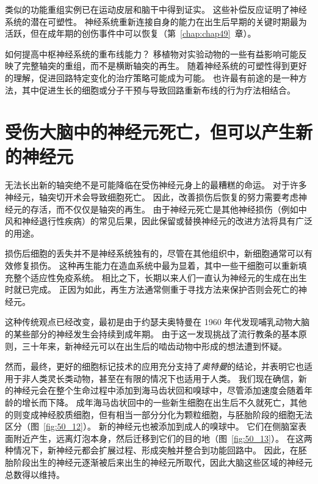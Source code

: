 类似的功能重组实例已在运动皮层和脑干中得到证实。
这些补偿反应证明了神经系统的潜在可塑性。
神经系统重新连接自身的能力在出生后早期的关键时期最为活跃，但在成年期的创伤事件中可以恢复（第~\ref{chap:chap49}~章）。


如何提高中枢神经系统的重布线能力？
移植物对实验动物的一些有益影响可能反映了完整轴突的重组，而不是横断轴突的再生。
随着神经系统的可塑性得到更好的理解，促进回路特定变化的治疗策略可能成为可能。
也许最有前途的是一种方法，其中促进生长的细胞或分子干预与导致回路重新布线的行为疗法相结合。



\section{受伤大脑中的神经元死亡，但可以产生新的神经元}

无法长出新的轴突绝不是可能降临在受伤神经元身上的最糟糕的命运。
对于许多神经元，轴突切开术会导致细胞死亡。
因此，改善损伤后恢复的努力需要考虑神经元的存活，而不仅仅是轴突的再生。
由于神经元死亡是其他神经损伤（例如中风和神经退行性疾病）的常见后果，因此保留或替换神经元的改进方法将具有广泛的用途。


损伤后细胞的丢失并不是神经系统独有的，尽管在其他组织中，新细胞通常可以有效修复损伤。
这种再生能力在造血系统中最为显着，其中一些干细胞可以重新填充整个适应性免疫系统。
相比之下，长期以来人们一直认为神经元的生成在出生时就已完成。
正因为如此，再生方法通常侧重于寻找方法来保护否则会死亡的神经元。


这种传统观点已经改变，最初是由于约瑟夫奥特曼在 1960 年代发现哺乳动物大脑的某些部分的神经发生会持续到成年期。
由于这一发现挑战了流行教条的基本原则，三十年来，新神经元可以在出生后的啮齿动物中形成的想法遭到怀疑。


然而，最终，更好的细胞标记技术的应用充分支持了\textit{奥特曼}的结论，并表明它也适用于非人类灵长类动物，甚至在有限的情况下也适用于人类。
我们现在确信，新的神经元会在整个生命过程中添加到海马齿状回和嗅球中，尽管添加速度会随着年龄的增长而下降。
成年海马齿状回中的一些新生细胞在出生后不久就死亡，其他的则变成神经胶质细胞，但有相当一部分分化为颗粒细胞，与胚胎阶段的细胞无法区分（图~\ref{fig:50_12}）。
新的神经元也被添加到成人的嗅球中。
它们在侧脑室表面附近产生，远离灯泡本身，然后迁移到它们的目的地（图~\ref{fig:50_13}）。
在这两种情况下，新神经元都会扩展过程、形成突触并整合到功能回路中。
因此，在胚胎阶段出生的神经元逐渐被后来出生的神经元所取代，因此大脑这些区域的神经元总数得以维持。



